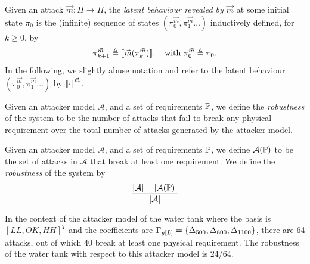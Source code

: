 {\begin{definition}
  \label{def:LatentBehaviour}
  Given an attack $\vec{m}\colon \Pi\rightarrow \Pi$, the \emph{latent behaviour revealed by $\vec{m}$} at some initial state $\pi_0$ is the (infinite) sequence of states $(\pi^{\vec{m}}_0, \pi^{\vec{m}}_1\ldots)$ inductively defined, for $k\geq 0$, by 
  \begin{align}
    \label{eq:newkCycle}
    {\pi}^{\vec{m}}_{k+1}\triangleq {{\llbracket\vec{m}({\pi}^{\vec{m}}_{k})\rrbracket}}, \quad \text{with ${\pi^{\vec{m}}_{0}}\triangleq \pi_0$.}
  \end{align}
In the following, we slightly abuse notation and refer to the latent behaviour $(\pi^{\vec{m}}_0, \pi^{\vec{m}}_1\ldots)$ by ${{{\llbracket\cdot\rrbracket}}}^{\vec{m}}$.
\end{definition}
Given an attacker model $\mathcal{A}$, and a set of requirements $\mathbb{P}$, we define the \emph{robustness} of the system to be the number of attacks that fail to break any physical requirement over the total number of attacks generated by the attacker model.

\begin{definition}[Robustness]
  \label{def:Robustness}
  Given an attacker model $\mathcal{A}$, and a set of requirements $\mathbb{P}$, we define $\mathcal{A}(\mathbb{P})$ to be the set of attacks in $\mathcal{A}$ that break at least one requirement. We define 
  the \emph{robustness} of the system by 
  \begin{align*}
    \frac{|\mathcal{A}|-|\mathcal{A}(\mathbb{P})|}{|\mathcal{A}|}
  \end{align*}
\end{definition}

\begin{example}
  In the context of the attacker model of the water tank where the basis is $[LL, OK, HH]^T$ and the coefficients are $\Gamma_{\vec{y}[L]}=\left\{{\Delta}_{500}, {\Delta}_{800},  {\Delta}_{1100}\right\}$, there are 64 attacks, out of which 40 break at least one physical requirement. The robustness of the water tank with respect to this attacker model is 24/64.
\end{example}
}
